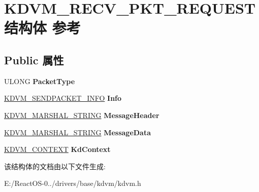 \hypertarget{struct_k_d_v_m___r_e_c_v___p_k_t___r_e_q_u_e_s_t}{}\section{K\+D\+V\+M\+\_\+\+R\+E\+C\+V\+\_\+\+P\+K\+T\+\_\+\+R\+E\+Q\+U\+E\+S\+T结构体 参考}
\label{struct_k_d_v_m___r_e_c_v___p_k_t___r_e_q_u_e_s_t}
\subsection*{Public 属性}
\begin{DoxyCompactItemize}
\item 
\mbox{\label{struct_k_d_v_m___r_e_c_v___p_k_t___r_e_q_u_e_s_t_a6a52131afb14d9869afe333a52ad2799}} 
U\+L\+O\+NG {\bfseries Packet\+Type}
\item 
\mbox{\label{struct_k_d_v_m___r_e_c_v___p_k_t___r_e_q_u_e_s_t_a4ce9d5cd19aa7e5ee0ad53e9b514f36c}} 
\hyperlink{struct_k_d_v_m___s_e_n_d_p_a_c_k_e_t___i_n_f_o}{K\+D\+V\+M\+\_\+\+S\+E\+N\+D\+P\+A\+C\+K\+E\+T\+\_\+\+I\+N\+FO} {\bfseries Info}
\item 
\mbox{\label{struct_k_d_v_m___r_e_c_v___p_k_t___r_e_q_u_e_s_t_a7b8e37e9259ad3b6918745d40f996105}} 
\hyperlink{struct___k_d_v_m___m_a_r_s_h_a_l___s_t_r_i_n_g}{K\+D\+V\+M\+\_\+\+M\+A\+R\+S\+H\+A\+L\+\_\+\+S\+T\+R\+I\+NG} {\bfseries Message\+Header}
\item 
\mbox{\label{struct_k_d_v_m___r_e_c_v___p_k_t___r_e_q_u_e_s_t_acca26c84c7f8c7074f0490b42dd58005}} 
\hyperlink{struct___k_d_v_m___m_a_r_s_h_a_l___s_t_r_i_n_g}{K\+D\+V\+M\+\_\+\+M\+A\+R\+S\+H\+A\+L\+\_\+\+S\+T\+R\+I\+NG} {\bfseries Message\+Data}
\item 
\mbox{\label{struct_k_d_v_m___r_e_c_v___p_k_t___r_e_q_u_e_s_t_a0dcc0d95d84bcf578b678ecac82d3326}} 
\hyperlink{struct___k_d_v_m___c_o_n_t_e_x_t}{K\+D\+V\+M\+\_\+\+C\+O\+N\+T\+E\+XT} {\bfseries Kd\+Context}
\end{DoxyCompactItemize}


该结构体的文档由以下文件生成\+:\begin{DoxyCompactItemize}
\item 
E\+:/\+React\+O\+S-\/0../drivers/base/kdvm/kdvm.\+h\end{DoxyCompactItemize}
